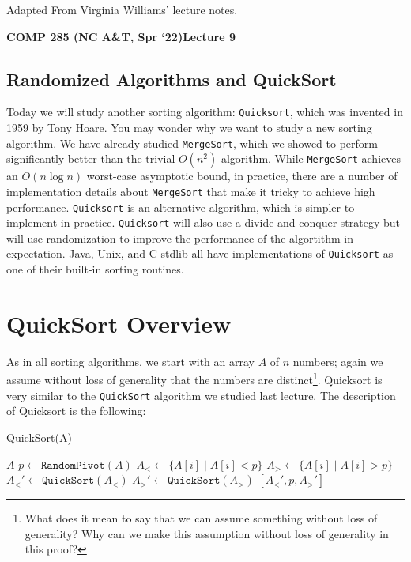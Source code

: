 \documentclass [12pt]{article}
\begin{document}
 

\vspace {1em} 
\begin {Instruction} 
Adapted From Virginia Williams' lecture notes.
\end {Instruction}  

{\LARGE \textbf {COMP 285 (NC A\&T, Spr `22)}\hfill \textbf {Lecture 9} } 

\begin{centering}
\section*{Randomized Algorithms and QuickSort}
\end{centering}

Today we will study another sorting algorithm: \texttt{Quicksort}, which was invented in 1959 by Tony
Hoare. You may wonder why we want to study a new sorting algorithm. We have already studied \texttt{MergeSort}, which we showed to perform significantly better than the trivial $O(n^2)$ algorithm. While \texttt{MergeSort} achieves an $O(n \log n)$ worst-case asymptotic bound, in practice,
there are a number of implementation details about \texttt{MergeSort} that make it tricky to achieve
high performance. \texttt{Quicksort} is an alternative algorithm, which is simpler to implement in
practice. \texttt{Quicksort} will also use a divide and conquer strategy but will use randomization to
improve the performance of the algortithm in expectation. Java, Unix, and C stdlib all have
implementations of \texttt{Quicksort} as one of their built-in sorting routines.


\section{QuickSort Overview}
As in all sorting algorithms, we start with an array $A$ of $n$ numbers; again we assume without
loss of generality that the numbers are distinct\footnote{What does it mean to say that we can assume something without loss of generality? Why can we make this assumption without loss of generality in this proof?}. Quicksort is very similar to the \texttt{QuickSort} algorithm we studied last lecture. The description of Quicksort is the following:

\begin{algorithm}
\caption{QuickSort(A)}\label{alg:QuickSort}
\begin{algorithmic}
    \RETURN $A$
\ENDIF
\STATE $p \gets \texttt{RandomPivot}(A)$
\STATE $A_< \gets \{A[i] \mid A[i] < p \}$
\STATE $A_> \gets \{A[i] \mid A[i] > p \}$
\STATE $A_<' \gets \texttt{QuickSort}(A_<)$
\STATE $A_>' \gets \texttt{QuickSort}(A_>)$
\RETURN $[A_<', p, A_>']$
\end{algorithmic}
\end{algorithm}
\end{document}
